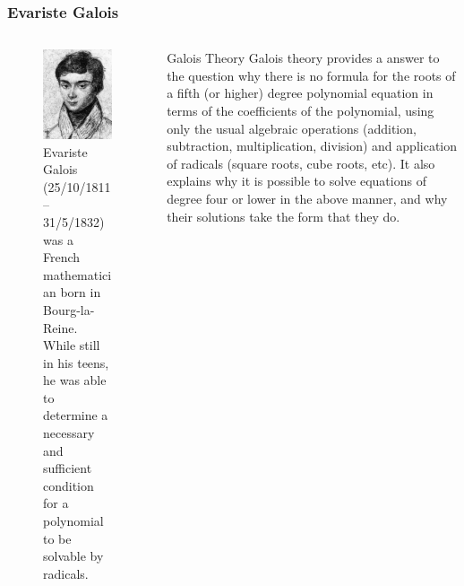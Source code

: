 \begin{frame}
	\frametitle{Evariste Galois}
	\begin{columns}
		\begin{column}{0.4\textwidth}
			\begin{figure}
				\centering
				\includegraphics[width=0.7\linewidth]{Images/Evariste_galois}
				\caption{\tiny{Evariste Galois (25/10/1811 $–$ 31/5/1832) was a French mathematician born in Bourg-la-Reine. While still in his teens, he was able to determine a necessary and sufficient condition for a polynomial to be solvable by radicals.}}
			\end{figure}
		\end{column}
		\begin{column}{0.6 \textwidth}
			\begin{block}{Galois Theory}
				\footnotesize{
				Galois theory provides a answer to the question why there is no formula for the roots of a fifth (or higher) degree polynomial equation in terms of the coefficients of the polynomial, using only the usual algebraic operations (addition, subtraction, multiplication, division) and application of radicals (square roots, cube roots, etc). It also explains why it is possible to solve equations of degree four or lower in the above manner, and why their solutions take the form that they do.}
			\end{block}
		\end{column}
	\end{columns}

\end{frame}
